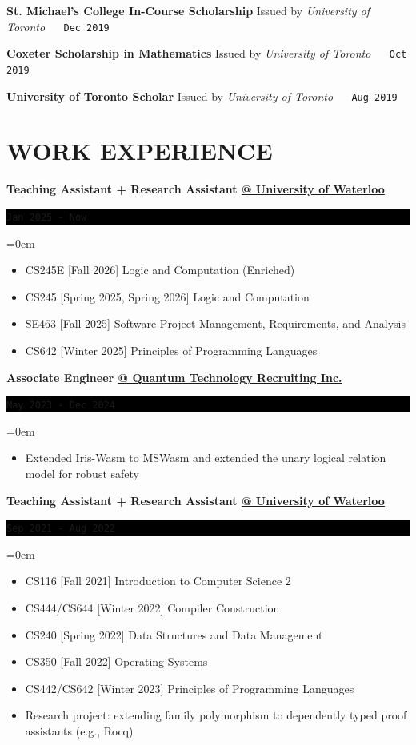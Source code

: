 \documentclass[fontsize=11pt]{article}
\newcommand{\NewPart}[1]{\section*{\uppercase{#1}}}
\newcommand{\EducationEntry}[4]{
    \noindent \textbf{#1} \hfill      %
    \colorbox{Black}{ 
      \parbox{11em}{
      \centering \color{White}#2}} \par  %
    \noindent \textit{#3} \par        %
    \noindent\hangindent=0em\hangafter=0 \small #4 %
    \normalsize \par}
\newcommand{\WorkEntry}[4]{       %
    \noindent \textbf{#1} \hfill      %
    \colorbox{Black}{%
      \parbox{11em}{%
      \centering\color{White}#2}} \par   %
    \noindent\hangindent=0em\hangafter=0 \small #4 %
    \normalsize \par}
\newcommand{\AwardEntry}[4]{         %
    \noindent \textbf{#1} \noindent \hfill Issued by \textit{#3}  
    $\quad$ \texttt{#2} %
    }
\begin{document}
    \AwardEntry
    {St. Michael's College In-Course Scholarship}
    {Dec 2019}
    {University of Toronto}
    {}
    
    \AwardEntry
    {Coxeter Scholarship in Mathematics}
    {Oct 2019}
    {University of Toronto}
    {}
    
    \AwardEntry
    {University of Toronto Scholar}
    {Aug 2019}
    {University of Toronto}
    {}
    

\NewPart{Work Experience}{}

\WorkEntry
{Teaching Assistant + Research Assistant \underline{@ University of Waterloo}}
{\texttt{Jan 2025 - Now}}
{}
{

  \begin{itemize} 
    \item CS245E [Fall 2026] Logic and Computation (Enriched)
    \item CS245 [Spring 2025, Spring 2026] Logic and Computation
    \item SE463 [Fall 2025] Software Project Management, Requirements, and Analysis
    \item CS642 [Winter 2025] Principles of Programming Languages
  \end{itemize}

}

\WorkEntry
{Associate Engineer  \underline{@ Quantum Technology Recruiting Inc.}}
{\texttt{May 2023 - Dec 2024}}
{}
{
  \begin{itemize} \itemsep -1pt
    \item Extended Iris-Wasm to MSWasm and extended the unary logical relation model for robust safety
    \end{itemize}
   }


\WorkEntry
{Teaching Assistant + Research Assistant \underline{@ University of Waterloo}}
{\texttt{Sep 2021 - Aug 2022}}
{}
{
\begin{itemize}
  \item CS116 [Fall 2021] Introduction to Computer Science 2 
  \item CS444/CS644 [Winter 2022] Compiler Construction
  \item CS240 [Spring 2022] Data Structures and Data Management
  \item CS350 [Fall 2022] Operating Systems
  \item CS442/CS642 [Winter 2023] Principles of Programming Languages
  \item Research project: extending family polymorphism to dependently typed proof assistants (e.g., Rocq)
\end{itemize}  
}
\end{document}
